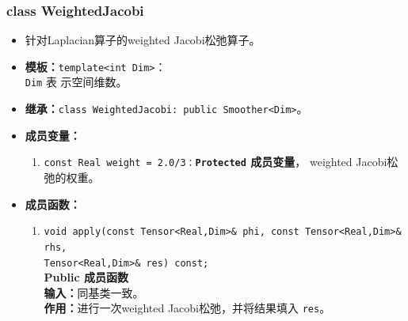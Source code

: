 \documentclass[a4paper,twoside]{ctexart}
\begin{document}
      \subsubsection*{class WeightedJacobi}
\begin{itemize}
    \item 针对Laplacian算子的weighted Jacobi松弛算子。
    \item \textbf{模板：}\texttt{template<int Dim>}：\\\texttt{Dim} 表
      示空间维数。
      \item \textbf{继承：}\texttt{class WeightedJacobi: public
          Smoother<Dim>}。
        \item \textbf{成员变量：}
        \begin{enumerate}[(1)]
            \item \texttt{const Real weight =
                2.0/3：}\textbf{\texttt{Protected}  成员变量}，
              weighted Jacobi松弛的权重。
               \end{enumerate}
    \item \textbf{成员函数：}
            \begin{enumerate}[(1)]
                \item \texttt{void apply(const Tensor<Real,Dim>\& phi, const Tensor<Real,Dim>\&
                     rhs, \\Tensor<Real,Dim>\& res) const;}\\
                  \textbf{Public 成员函数}\\
                \textbf{输入：}同基类一致。\\
                \textbf{作用：}进行一次weighted Jacobi松弛，并将结果填入
                \texttt{res}。
            \end{enumerate}
\end{itemize}
      
\end{document}
